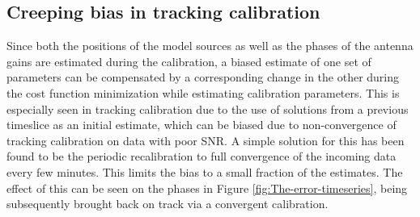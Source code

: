 \documentclass{aa}
\begin{document}
\subsection{Creeping bias in tracking calibration}

Since both  the positions  of the  model sources as  well as  the phases  of the
antenna gains are estimated during the calibration, a biased estimate of one set
of parameters can  be compensated by a corresponding change  in the other during
the cost function minimization  while estimating calibration parameters. This is
especially  seen in  tracking calibration  due to  the use  of solutions  from a
previous  timeslice  as  an  initial  estimate,  which  can  be  biased  due  to
non-convergence  of  tracking calibration  on  data  with  poor SNR.   A  simple
solution  for this  has been  found  to be  the periodic  recalibration to  full
convergence of  the incoming data every few  minutes. This limits the  bias to a
small fraction of the  estimates.  The effect of this can be  seen on the phases
in  Figure \ref{fig:The-error-timeseries},  being  subsequently brought  back  on track  via a  convergent
calibration.




\end{document}
